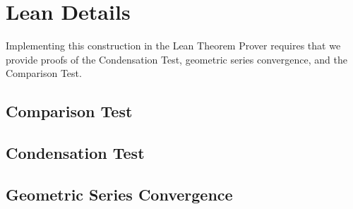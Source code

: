 \documentclass[12pt,reqno]{amsart}
\numberwithin{equation}{section}
\begin{document}
\section{Lean Details}

Implementing this construction in the Lean Theorem Prover requires that we provide proofs of the Condensation Test, geometric series convergence, and the Comparison Test. 

\subsection{Comparison Test}


\subsection{Condensation Test}


\subsection{Geometric Series Convergence}


\newpage




\end{document}
